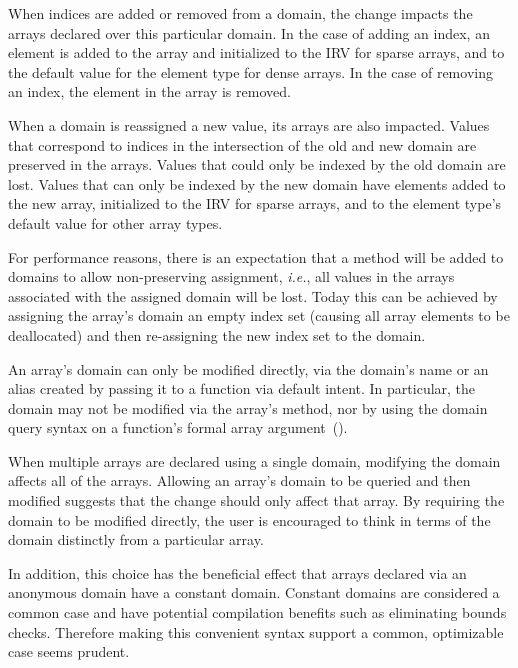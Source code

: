 When indices are added or removed from a domain, the change impacts
the arrays declared over this particular domain.  In the case of
adding an index, an element is added to the array and initialized to
the IRV for sparse arrays, and to the default value for the element
type for dense arrays.  In the case of removing an index, the element
in the array is removed.

When a domain is reassigned a new value, its arrays are also impacted.
Values that correspond to indices in the intersection of the old and
new domain are preserved in the arrays.  Values that could only be
indexed by the old domain are lost.  Values that can only be indexed
by the new domain have elements added to the new array, initialized to
the IRV for sparse arrays, and to the element type's default value for
other array types.

For performance reasons, there is an expectation that a method will be
added to domains to allow non-preserving assignment, \emph{i.e.}, all
values in the arrays associated with the assigned domain will be lost.
Today this can be achieved by assigning the array's domain an empty
index set (causing all array elements to be deallocated) and then
re-assigning the new index set to the domain.

An array's domain can only be modified directly, via the domain's name
or an alias created by passing it to a function via default intent.  In
particular, the domain may not be modified via the array's
 method, nor by using the domain query syntax on a
function's formal array
argument~().

\begin{rationale}
When multiple arrays are declared using a single domain, modifying the
domain affects all of the arrays.  Allowing an array's domain to be
queried and then modified suggests that the change should only affect
that array.  By requiring the domain to be modified directly, the user
is encouraged to think in terms of the domain distinctly from a
particular array.

In addition, this choice has the beneficial effect that arrays
declared via an anonymous domain have a constant domain.  Constant
domains are considered a common case and have potential compilation
benefits such as eliminating bounds checks.  Therefore making this
convenient syntax support a common, optimizable case seems prudent.
\end{rationale}


